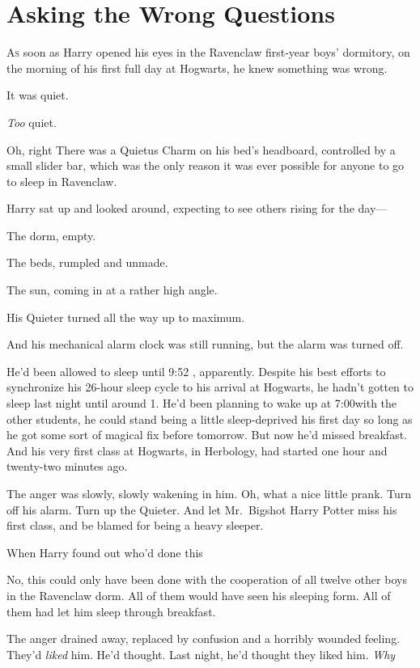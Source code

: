 \chapter{Asking the Wrong Questions}

\lettrine{A}{s} soon as Harry opened his eyes in the Ravenclaw first-year boys' dormitory,
on the morning of his first full day at Hogwarts, he knew something was wrong.

It was quiet.

\emph{Too} quiet.

Oh, right{\el} There was a Quietus Charm on his bed's headboard, controlled
by a small slider bar, which was the only reason it was ever possible for
anyone to go to sleep in Ravenclaw.

Harry sat up and looked around, expecting to see others rising for the day—

The dorm, empty.

The beds, rumpled and unmade.

The sun, coming in at a rather high angle.

His Quieter turned all the way up to maximum.

And his mechanical alarm clock was still running, but the alarm was turned off.

He'd been allowed to sleep until 9:52 \AM, apparently. Despite his best efforts
to synchronize his 26-hour sleep cycle to his arrival at Hogwarts, he hadn't
gotten to sleep last night until around 1\AM. He'd been planning to wake up at
7:00\AM with the other students, he could stand being a little sleep-deprived
his first day so long as he got some sort of magical fix before tomorrow. But
now he'd missed breakfast. And his very first class at Hogwarts, in Herbology,
had started one hour and twenty-two minutes ago.

The anger was slowly, slowly wakening in him. Oh, what a nice little prank.
Turn off his alarm. Turn up the Quieter. And let Mr.~Bigshot Harry Potter miss
his first class, and be blamed for being a heavy sleeper.

When Harry found out who'd done this{\el}

No, this could only have been done with the cooperation of all twelve other
boys in the Ravenclaw dorm. All of them would have seen his sleeping form. All
of them had let him sleep through breakfast.

The anger drained away, replaced by confusion and a horribly wounded feeling.
They'd \emph{liked} him. He'd thought. Last night, he'd thought they liked him.
\emph{Why{\el}}

